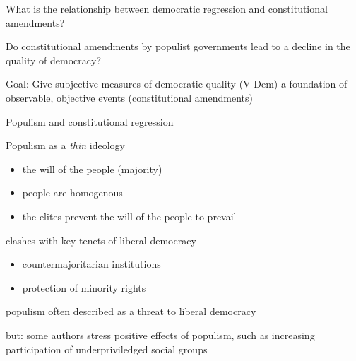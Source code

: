 \documentclass[xcolor=dvipsnames,aspectratio=169,12pt]{beamer}
\begin{document}


\begin{frame}{}
\begin{wideitemize}
    \item What is the relationship between democratic regression and constitutional amendments?
    \item Do constitutional amendments by populist governments lead to a decline in the quality of democracy?
    \item Goal: Give subjective measures of democratic quality (V-Dem) a foundation of observable, objective events (constitutional amendments)
\end{wideitemize} 
\end{frame}

\begin{frame}{Populism and constitutional regression}

    \begin{wideitemize}
        \item Populism as a \textit{thin} ideology
        \begin{itemize}
        \item the will of the people (majority)
        \item people are homogenous
        \item the elites prevent the will of the people to prevail
        \end{itemize}
        \item clashes with key tenets of liberal democracy
        \begin{itemize}
            \item countermajoritarian institutions
            \item protection of minority rights
        \end{itemize} 
    \item populism often described as a threat to liberal democracy
    \item but: some authors stress positive effects of populism, such as increasing participation of underpriviledged social groups 
\end{wideitemize}
\end{frame}
\end{document}
